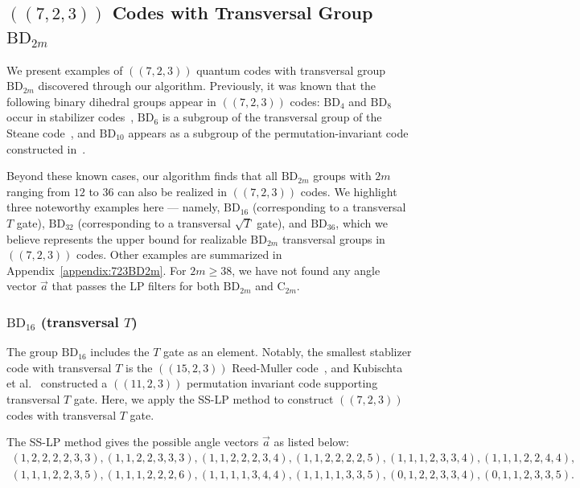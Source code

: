 \documentclass[8pt]{article}
\theoremstyle{definition}
\begin{document}
\subsection{\texorpdfstring{$((7,2,3))$}{((7,2,3))} Codes with Transversal Group \texorpdfstring{$\mathrm{BD}_{2m}$}{BD₂ₘ}}\label{subsec:723BD16}

We present examples of \(((7,2,3))\) quantum codes with transversal group \(\mathrm{BD}_{2m}\) discovered through our algorithm. Previously, it was known that the following binary dihedral groups appear in \(((7,2,3))\) codes: \(\mathrm{BD}_4\) and \(\mathrm{BD}_8\) occur in stabilizer codes~\cite{cross2025small}, \(\mathrm{BD}_6\) is a subgroup of the transversal group of the Steane code~\cite{steane1996simple}, and \(\mathrm{BD}_{10}\) appears as a subgroup of the permutation-invariant code constructed in~\cite{kubischta2023family}.

Beyond these known cases, our algorithm finds that all \(\mathrm{BD}_{2m}\) groups with \(2m\) ranging from \(12\) to \(36\) can also be realized in \(((7,2,3))\) codes. We highlight three noteworthy examples here — namely, \(\mathrm{BD}_{16}\) (corresponding to a transversal \(T\) gate), \(\mathrm{BD}_{32}\) (corresponding to a transversal \(\sqrt{T}\) gate), and \(\mathrm{BD}_{36}\), which we believe represents the upper bound for realizable \(\mathrm{BD}_{2m}\) transversal groups in \(((7,2,3))\) codes. Other examples are summarized in Appendix~\ref{appendix:723BD2m}.
For \(2m \geq 38\), we have not found any angle vector \(\vec{a}\) that passes the LP filters for both \(\mathrm{BD}_{2m}\) and \(\mathrm{C}_{2m}\).

\subsubsection{\texorpdfstring{$\mathrm{BD}_{16}$}{BD₁₆} (transversal \texorpdfstring{$T$}{T})}

The group \(\mathrm{BD}_{16}\) includes the \(T\) gate as an element. Notably, the smallest stablizer code with transversal $T$ is the $((15,2,3))$ Reed-Muller code~\cite{koutsioumpas2024quantum}, and Kubischta et al.~\cite{kubischta2024permutationinvariantquantumcodestransversal} constructed a $((11,2,3))$ permutation invariant code supporting transversal \(T\) gate. Here, we apply the SS-LP method to construct $((7,2,3))$ codes with transversal \(T\) gate.

The SS-LP method gives the possible angle vectors $\vec{a}$ as listed below:
\begin{align*}
    \left(1,2,2,2,2,3,3\right),\left(1,1,2,2,3,3,3\right),\left(1,1,2,2,2,3,4\right),\left(1,1,2,2,2,2,5\right),\left(1,1,1,2,3,3,4\right),\left(1,1,1,2,2,4,4\right), \\
    \left(1,1,1,2,2,3,5\right),\left(1,1,1,2,2,2,6\right),\left(1,1,1,1,3,4,4\right),\left(1,1,1,1,3,3,5\right),\left(0,1,2,2,3,3,4\right),\left(0,1,1,2,3,3,5\right).
\end{align*}
\end{document}
